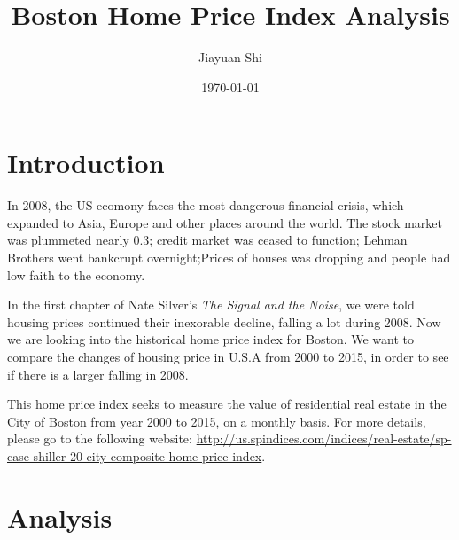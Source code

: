 \documentclass{report}
\begin{document}
\title{Boston Home Price Index Analysis}
\author{Jiayuan Shi}
\date{\today}
\maketitle


\section{Introduction}
In 2008, the US ecomony faces the most dangerous financial crisis, which expanded to Asia, Europe and other places around the world. The stock market was plummeted nearly 0.3; credit market was ceased to function; Lehman Brothers went bankcrupt overnight;Prices of houses was dropping and people had low faith to the economy.\

In the first chapter of Nate Silver's \textit{The Signal and the Noise}, we were told housing prices continued their inexorable decline, falling a lot during 2008. Now we are looking into the historical home price index for Boston. We want to compare the changes of housing price in U.S.A from 2000 to 2015, in order to see if there is a larger falling in 2008.\

This home price index seeks to measure the value of residential real estate in the City of Boston from year 2000 to 2015, on a monthly basis. For more details, please go to the following website: \url{http://us.spindices.com/indices/real-estate/sp-case-shiller-20-city-composite-home-price-index}. 

\section{Analysis}
\end{document}
